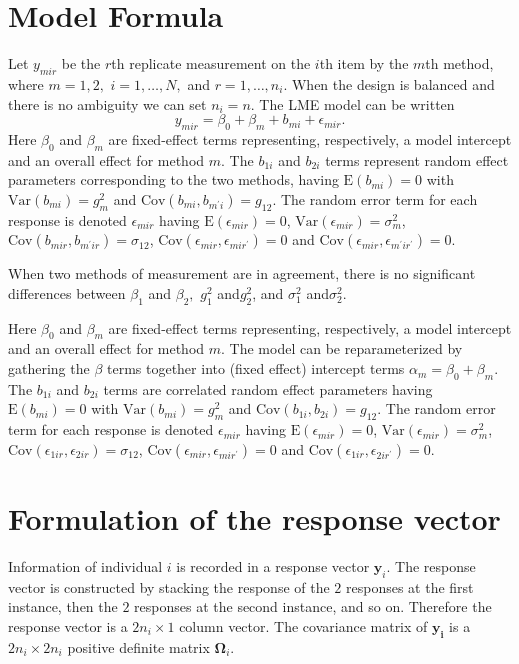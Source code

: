 \documentclass[12pt, a4paper]{report}
\theoremstyle{plain}
\theoremstyle{definition}
\theoremstyle{remark}
\begin{document}
\section{Model Formula}
Let $y_{mir} $ be the $r$th replicate measurement on the $i$th item by the $m$th method, where $m=1,2,$ $i=1,\ldots,N,$ and $r = 1,\ldots,n_i.$ When the design is balanced and there is no ambiguity we can set $n_i=n.$ The LME model can be written
	\begin{equation}
	y_{mir} = \beta_{0} + \beta_{m} + b_{mi} + \epsilon_{mir}.
	\end{equation}
Here $\beta_0$ and $\beta_m$ are fixed-effect terms representing, respectively, a model intercept and an overall effect for method $m.$ The $b_{1i}$ and $b_{2i}$ terms represent random effect parameters corresponding to the two methods, having $\mathrm{E}(b_{mi})=0$ with $\mathrm{Var}(b_{mi})=g^2_m$ and $\mathrm{Cov}(b_{mi}, b_{m^\prime i})=g_{12}.$ The random error term for each response is denoted $\epsilon_{mir}$ having $\mathrm{E}(\epsilon_{mir})=0$, $\mathrm{Var}(\epsilon_{mir})=\sigma^2_m$, $\mathrm{Cov}(b_{mir}, b_{m^\prime ir})=\sigma_{12}$, $\mathrm{Cov}(\epsilon_{mir}, \epsilon_{mir^\prime})= 0$ and $\mathrm{Cov}(\epsilon_{mir}, \epsilon_{m^\prime ir^\prime})= 0.$
\bigskip

When two methods of measurement are in agreement, there is no significant differences between $\beta_1$ and $\beta_2,$ $g^2_1 $ and$ g^2_2$, and $\sigma^2_1 $ and$ \sigma^2_2$.
	
	Here $\beta_0$ and $\beta_m$ are fixed-effect terms representing, respectively, a model intercept and an overall effect for method $m.$ The model can be reparameterized by gathering the $\beta$ terms together into (fixed effect) intercept terms $\alpha_m=\beta_0+\beta_m.$ The $b_{1i}$ and $b_{2i}$ terms are correlated random effect parameters having $\mathrm{E}(b_{mi})=0$ with $\mathrm{Var}(b_{mi})=g^2_m$ and $\mathrm{Cov}(b_{1i}, b_{2 i})=g_{12}.$ The random error term for each response is denoted $\epsilon_{mir}$ having $\mathrm{E}(\epsilon_{mir})=0$, $\mathrm{Var}(\epsilon_{mir})=\sigma^2_m$, $\mathrm{Cov}(\epsilon_{1ir}, \epsilon_{2 ir})=\sigma_{12}$, $\mathrm{Cov}(\epsilon_{mir}, \epsilon_{mir^\prime})= 0$ and $\mathrm{Cov}(\epsilon_{1ir}, \epsilon_{2 ir^\prime})= 0.$ 
	


\newpage
\section{Formulation of the response vector}
Information of individual $i$ is recorded in a response vector $\boldsymbol{y}_{i}$. The response vector is constructed by stacking the response of the $2$ responses at the first instance, then the $2$ responses at the second instance, and so on. Therefore the response vector is a $2n_{i} \times 1$ column vector.
The covariance matrix of $\boldsymbol{y_{i}}$ is a $2n_{i} \times 2n_{i}$ positive definite matrix $\boldsymbol{\Omega}_{i}$.
\end{document}
